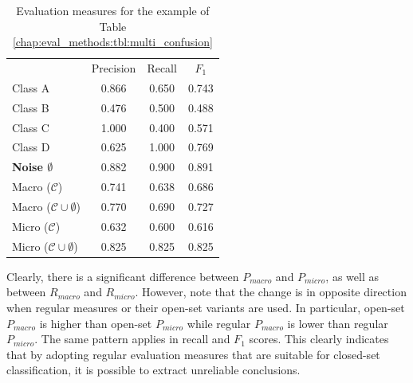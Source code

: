 \begin{table}[t]
	\center
	\caption{Evaluation measures for the example of Table \ref{chap:eval_methods:tbl:multi_confusion}}\label{chap:eval_methods:tbl:macro_vs_micro}
	\begin{tabular}{c c c c}
		\cline{2-4}
		& \multicolumn{1}{|c}{Precision} & \multicolumn{1}{c}{Recall} & \multicolumn{1}{c|}{$F_{1}$}\\
		\cline{1-4}
		\multicolumn{1}{|l}{Class A} & \multicolumn{1}{|c}{0.866} & \multicolumn{1}{c}{0.650} & \multicolumn{1}{c|}{0.743}\\
		\multicolumn{1}{|l}{Class B} & \multicolumn{1}{|c}{0.476} & \multicolumn{1}{c}{0.500} & \multicolumn{1}{c|}{0.488}\\
		\multicolumn{1}{|l}{Class C} & \multicolumn{1}{|c}{1.000} & \multicolumn{1}{c}{0.400} & \multicolumn{1}{c|}{0.571}\\
		\multicolumn{1}{|l}{Class D} & \multicolumn{1}{|c}{0.625} & \multicolumn{1}{c}{1.000} & \multicolumn{1}{c|}{0.769}\\
		\multicolumn{1}{|l}{\textbf{Noise $\emptyset$}} & \multicolumn{1}{|c}{0.882} & \multicolumn{1}{c}{0.900} & \multicolumn{1}{c|}{0.891}\\
		\cline{1-4}
		\multicolumn{1}{|l}{Macro ($\mathcal{C}$)} & \multicolumn{1}{|c}{0.741} & \multicolumn{1}{c}{0.638} & \multicolumn{1}{c|}{0.686}\\
		\multicolumn{1}{|l}{Macro ($\mathcal{C} \cup \emptyset$)} & \multicolumn{1}{|c}{0.770} & \multicolumn{1}{c}{0.690} & \multicolumn{1}{c|}{0.727}\\
		\multicolumn{1}{|l}{Micro ($\mathcal{C}$)} & \multicolumn{1}{|c}{0.632} & \multicolumn{1}{c}{0.600} & \multicolumn{1}{c|}{0.616}\\
		\multicolumn{1}{|l}{Micro ($\mathcal{C} \cup \emptyset$)} & \multicolumn{1}{|c}{0.825} & \multicolumn{1}{c}{0.825} & \multicolumn{1}{c|}{0.825}\\
		\cline{1-4}
	\end{tabular}
\end{table}

Clearly, there is a significant difference between $P_{macro}$ and $P_{micro}$, as well as between $R_{macro}$ and $R_{micro}$. However, note that the change is in opposite direction when regular measures or their open-set variants are used. In particular, open-set $P_{macro}$ is higher than open-set $P_{micro}$ while regular $P_{macro}$ is lower than regular $P_{micro}$. The same pattern applies in recall and $F_1$ scores. This clearly indicates that by adopting regular evaluation measures that are suitable for closed-set classification, it is possible to extract unreliable conclusions.

